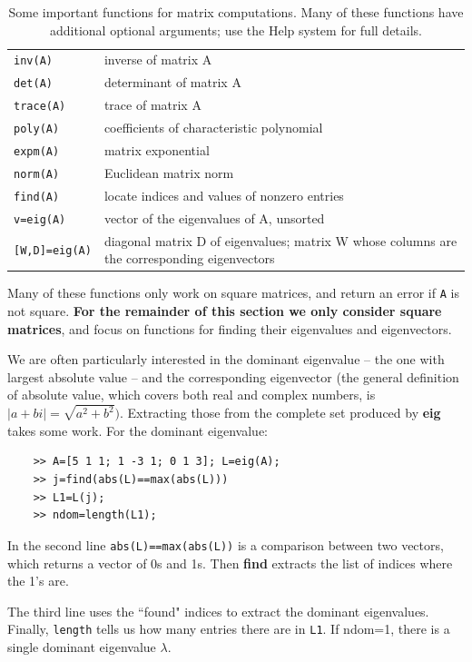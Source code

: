 \documentclass [11pt]{article}
\newcommand{\ttt}[1]{\texttt{#1}}
\numberwithin{exercise}{section}
\begin{document}
\begin{table}
\begin{tabular}{p{120pt}p{300pt}}
\hline \hline 
{\tt inv(A)} & inverse of matrix A  \\
{\tt det(A)} & determinant of matrix A  \\
{\tt trace(A)} & trace of matrix A \\
{\tt poly(A)} & coefficients of characteristic polynomial \\
{\tt expm(A)} & matrix exponential \\
{\tt norm(A)} & Euclidean matrix norm  \\
{\tt find(A)} & locate indices and values of nonzero entries \\
{\tt v=eig(A)} & vector of the eigenvalues of A, unsorted \\
{\tt [W,D]=eig(A)} & diagonal matrix D of eigenvalues; matrix W whose columns are the corresponding eigenvectors \\
\hline \hline 
\end{tabular}
\caption{Some important functions for matrix computations. Many
of these functions have additional optional arguments; use the Help system for full details.}
\label{MatrixComputationsTable}
\end{table}

Many of these functions only work on square matrices, and return an error if \ttt{A} is not square. 
\textbf{For the remainder of this section we only consider square matrices}, and focus on functions for 
finding their eigenvalues and eigenvectors.

We are often particularly interested in the dominant eigenvalue -- the one with 
largest absolute value -- and the corresponding eigenvector (the general 
definition of absolute value, which covers both real and complex numbers, is 
$\left| {a + bi} \right| = \sqrt {a^2 + b^2} )$. Extracting those from the 
complete set produced by \textbf{eig} takes some work. For
the dominant eigenvalue: 
\begin{verbatim}
    >> A=[5 1 1; 1 -3 1; 0 1 3]; L=eig(A); 
    >> j=find(abs(L)==max(abs(L)))
    >> L1=L(j);
    >> ndom=length(L1);
\end{verbatim}

In the second line \texttt{abs(L)==max(abs(L))} is a comparison 
between two vectors, which returns a vector of 0s and 1s. 
Then \textbf{find} extracts the list of indices where the 1's are. 

The third line uses the ``found" indices to extract the dominant 
eigenvalues. Finally, \texttt{length} tells us how many entries there are in \texttt{L1}. 
If ndom=1, there is a single dominant eigenvalue $\lambda $. 
\end{document}
